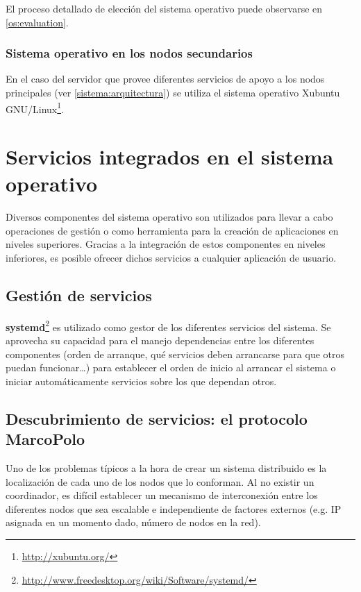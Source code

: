 El proceso detallado de elección del sistema operativo puede observarse en \ref{os:evaluation}.
\subsubsection{Sistema operativo en los nodos secundarios}

En el caso del servidor que provee diferentes servicios de apoyo a los nodos principales (ver \ref{sistema:arquitectura}) se utiliza el sistema operativo Xubuntu GNU/Linux\footnote{\href{http://xubuntu.org/}{http://xubuntu.org/}}.%

\section{Servicios integrados en el sistema operativo}

Diversos componentes del sistema operativo son utilizados para llevar a cabo operaciones de gestión o como herramienta para la creación de aplicaciones en niveles superiores. Gracias a la integración de estos componentes en niveles inferiores, es posible ofrecer dichos servicios a cualquier aplicación de usuario. 

\subsection{Gestión de servicios}

\textbf{systemd}\footnote{\href{http://www.freedesktop.org/wiki/Software/systemd/}{http://www.freedesktop.org/wiki/Software/systemd/}} es utilizado como gestor de los diferentes servicios del sistema. Se aprovecha su capacidad para el manejo dependencias entre los diferentes componentes (orden de arranque, qué servicios deben arrancarse para que otros puedan funcionar\dots) para establecer el orden de inicio al arrancar el sistema o iniciar automáticamente servicios sobre los que dependan otros.


\subsection{Descubrimiento de servicios: el protocolo MarcoPolo}

Uno de los problemas típicos a la hora de crear un sistema distribuido es la localización de cada uno de los nodos que lo conforman. Al no existir un coordinador, es difícil establecer un mecanismo de interconexión entre los diferentes nodos que sea escalable e independiente de factores externos (e.g. IP asignada en un momento dado, número de nodos en la red).

